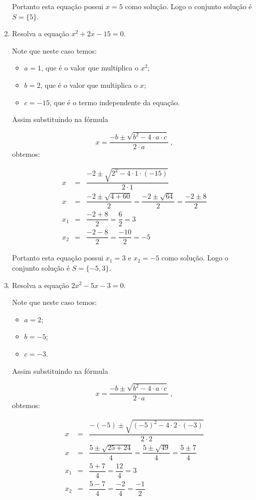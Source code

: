 \begin{exem}
\begin{enumerate}[1)]
 Portanto esta equação possui $x= 5$ como solução.  Logo o conjunto solução é $S= \{5\}$.

 \item Resolva a equação $x^2+2x-15= 0$.

 Note que neste caso temos:
  \begin{itemize}
  \item $a= 1$, que é o valor que multiplica o $x^2$;
  \item $b= 2$, que é o valor que multiplica o $x$;
  \item $c= -15$, que é o termo independente da equação.
  \end{itemize}
  Assim substituindo na fórmula

 \[x = \dfrac{-b \pm \sqrt{b^2 - 4 \cdot a \cdot c}}{2 \cdot a} \ ,\]
 obtemos:

 \begin{eqnarray*}
 x &=& \dfrac{-2 \pm \sqrt{2^2 - 4 \cdot 1 \cdot (-15)}}{2 \cdot 1} \\
 x &=& \dfrac{-2 \pm \sqrt{4 + 60}}{2}= \dfrac{-2 \pm \sqrt{64}}{2}= \dfrac{-2 \pm 8}{2} \\
 x_1 &=& \dfrac{-2 + 8}{2}= \dfrac{6}{2}= 3 \\
 x_2 &=& \dfrac{-2 - 8}{2}= \dfrac{-10}{2}= -5
 \end{eqnarray*}

 Portanto esta equação possui $x_1= 3$ e $x_2= -5$ como solução. Logo o conjunto solução é $S= \{-5, 3\}$.

  \item Resolva a equação $2x^2 - 5x - 3= 0$.

 Note que neste caso temos:
  \begin{itemize}
  \item $a= 2$;
  \item $b= -5$;
  \item $c= -3$.
  \end{itemize}
  Assim substituindo na fórmula

 \[x = \dfrac{-b \pm \sqrt{b^2 - 4 \cdot a \cdot c}}{2 \cdot a} \ ,\]
 obtemos:

 \begin{eqnarray*}
 x &=& \dfrac{-(-5) \pm \sqrt{(-5)^2 - 4 \cdot 2 \cdot (-3)}}{2 \cdot 2} \\
 x &=& \dfrac{5 \pm \sqrt{25 + 24}}{4}= \dfrac{5 \pm \sqrt{49}}{4}= \dfrac{5 \pm 7}{4} \\
 x_1 &=& \dfrac{5 + 7}{4}= \dfrac{12}{4}= 3 \\
 x_2 &=& \dfrac{5 - 7}{4}= \dfrac{-2}{4}= \dfrac{-1}{2}
 \end{eqnarray*}


\end{enumerate}
\end{exem}
